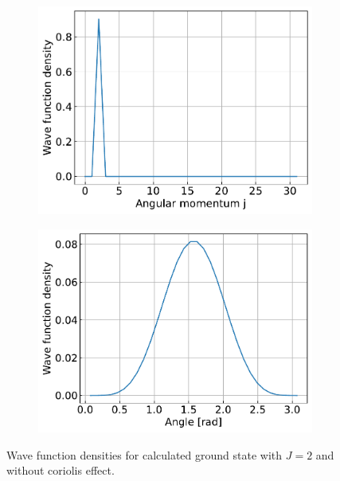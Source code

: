 \documentclass{article}
\begin{document}
\begin{figure}[H]
\begin{subfigure}{.4\linewidth}
        \end{subfigure}
        \begin{subfigure}{.4\linewidth}
            \centering
            \includegraphics[width=\linewidth]{harmonic_iso_angular.pdf}
        \end{subfigure}
        \begin{subfigure}{.4\linewidth}
            \centering
            \includegraphics[width=\linewidth]{harmonic_iso_polar.pdf}
        \end{subfigure}
        \caption{Wave function densities for calculated ground state with $J = 2$ and without coriolis effect.}
    \end{figure}
\end{document}
